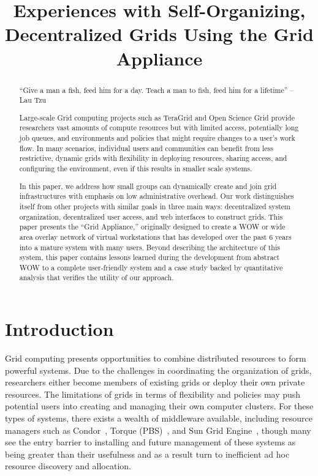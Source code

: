 \documentclass[conference]{IEEEtran}
\begin{document}
\title{Experiences with Self-Organizing, Decentralized Grids Using the Grid
Appliance}

\author{
}

\maketitle


\begin{abstract}

``Give a man a fish, feed him for a day.  Teach a man to fish, feed him for a
lifetime'' -- Lau Tzu

Large-scale Grid computing projects such as TeraGrid and Open Science Grid
provide researchers vast amounts of compute resources but with limited access,
potentially long job queues, and environments and policies that might require
changes to a user's work flow. In many scenarios, individual users and
communities can benefit from less restrictive, dynamic grids with flexibility
in deploying resources, sharing access, and configuring the environment, even
if this results in smaller scale systems.

In this paper, we address how small groups can dynamically create and join grid
infrastructures with emphasis on low administrative overhead.  Our work
distinguishes itself from other projects with similar goals in three main ways:
decentralized system organization, decentralized user access, and web
interfaces to construct grids.  This paper presents the ``Grid Appliance,''
originally designed to create a WOW or wide area overlay network of virtual
workstations that has developed over the past 6 years into a mature system with
many users.  Beyond describing the architecture of this system, this paper
contains lessons learned during the development from abstract WOW to a complete
user-friendly system and a case study backed by quantitative analysis that
verifies the utility of our approach.  

\end{abstract}

\section{Introduction}

Grid computing presents opportunities to combine distributed resources to form
powerful systems.  Due to the challenges in coordinating the organization of
grids, researchers either become members of existing grids or deploy their own
private resources.  The limitations of grids in terms of flexibility and
policies may push potential users into creating and managing their own computer
clusters.  For these types of systems, there exists a wealth of middleware
available, including resource managers such as Condor~\cite{condor0}, Torque
(PBS)~\cite{torque}, and Sun Grid Engine~\cite{grid_engine}, though many see
the entry barrier to installing and future management of these systems as being
greater than their usefulness and as a result turn to inefficient ad hoc
resource discovery and allocation.
\end{document}
